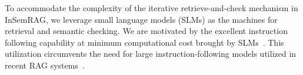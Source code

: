 

To accommodate the complexity of the iterative retrieve-and-check mechanism in InSemRAG, we leverage small language models (SLMs) as the machines for retrieval and semantic checking.
We are motivated by the excellent instruction following capability at minimum computational cost brought by SLMs~\cite{wang2025comprehensive,lee2024mentor}.
This utilization circumvents the need for large instruction-following models utilized in recent RAG systems~\cite{shen2024retrieval}.


